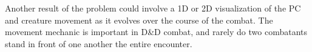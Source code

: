 \documentclass[9pt, onecolumn]{report}
\begin{document}
Another result of the problem could involve a 1D or 2D visualization of the PC and creature movement as it evolves over the course of the combat. The movement mechanic is important in D\&D combat, and rarely do two combatants stand in front of one another the entire encounter.

% 
% 
\end{document}
